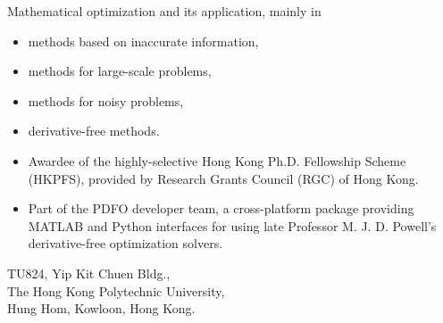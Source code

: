 Mathematical optimization and its application, mainly in
\begin{itemize}
    \item methods based on inaccurate information,
    \item methods for large-scale problems,
    \item methods for noisy problems,
    \item derivative-free methods.
\end{itemize}


\cvtag{\LaTeX}


\begin{itemize}
    \item Awardee of the highly-selective Hong Kong Ph.D. Fellowship Scheme (HKPFS), provided by Research Grants Council (RGC) of Hong Kong.
    \item Part of the PDFO developer team, a cross-platform package providing MATLAB and Python interfaces for using late Professor M. J. D. Powell's derivative-free optimization solvers.
\end{itemize}




{TU824, Yip Kit Chuen Bldg., \\The Hong Kong Polytechnic University, \\ Hung Hom, Kowloon, Hong Kong.}

